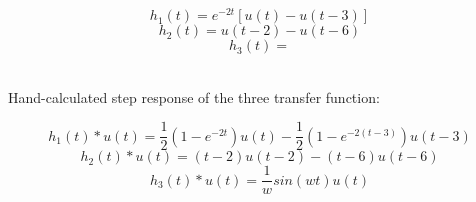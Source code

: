 \documentclass[12pt,a4paper]{article}
\begin{document}
\begin{equation}
    h_1(t) = e^{-2t}[u(t) - u(t-3)]
\end{equation}
\begin{equation}
    h_2(t) = u(t-2) - u(t-6)
\end{equation}
\begin{equation}
    h_3(t) = 
\end{equation}

    \\ Hand-calculated step response of the three transfer function:
    
\begin{equation}
    h_1(t)*u(t) = \frac{1}{2}(1-e^{-2t})u(t) - \frac{1}{2}(1-e^{-2(t-3)})u(t-3)
\end{equation}
\begin{equation}
    h_2(t)*u(t) = (t-2)u(t-2)-(t-6)u(t-6)
\end{equation}
\begin{equation}
    h_3(t)*u(t) = \frac{1}{w}sin(wt)u(t)
\end{equation}  
\end{document}

